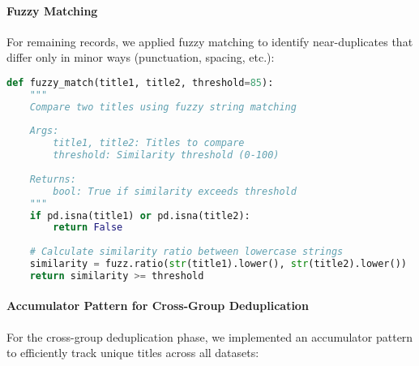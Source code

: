 \documentclass[12pt]{article}
\begin{document}
\paragraph{Fuzzy Matching}\label{fuzzy-matching}

For remaining records, we applied fuzzy matching to identify
near-duplicates that differ only in minor ways (punctuation, spacing,
etc.):

\begin{lstlisting}[language=Python]
def fuzzy_match(title1, title2, threshold=85):
    """
    Compare two titles using fuzzy string matching
    
    Args:
        title1, title2: Titles to compare
        threshold: Similarity threshold (0-100)
        
    Returns:
        bool: True if similarity exceeds threshold
    """
    if pd.isna(title1) or pd.isna(title2):
        return False
        
    # Calculate similarity ratio between lowercase strings
    similarity = fuzz.ratio(str(title1).lower(), str(title2).lower())
    return similarity >= threshold
\end{lstlisting}

\paragraph{Accumulator Pattern for Cross-Group
Deduplication}\label{accumulator-pattern-for-cross-group-deduplication}

For the cross-group deduplication phase, we implemented an accumulator
pattern to efficiently track unique titles across all datasets:
\end{document}

